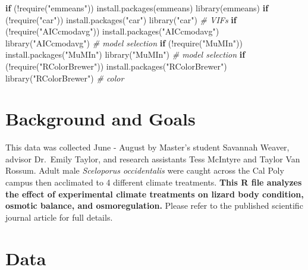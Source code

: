 \documentclass[
]{article}
\newenvironment{Shaded}{\begin{snugshade}}{\end{snugshade}}
\newcommand{\CommentTok}[1]{\textcolor[rgb]{0.56,0.35,0.01}{\textit{#1}}}
\newcommand{\ControlFlowTok}[1]{\textcolor[rgb]{0.13,0.29,0.53}{\textbf{#1}}}
\newcommand{\FunctionTok}[1]{\textcolor[rgb]{0.00,0.00,0.00}{#1}}
\newcommand{\NormalTok}[1]{#1}
\newcommand{\SpecialCharTok}[1]{\textcolor[rgb]{0.00,0.00,0.00}{#1}}
\newcommand{\StringTok}[1]{\textcolor[rgb]{0.31,0.60,0.02}{#1}}
\begin{document}
\begin{Shaded}
\begin{Highlighting}[]
\ControlFlowTok{if}\NormalTok{ (}\SpecialCharTok{!}\FunctionTok{require}\NormalTok{(}\StringTok{"emmeans"}\NormalTok{)) }\FunctionTok{install.packages}\NormalTok{(}\StringTok{\textquotesingle{}emmeans\textquotesingle{}}\NormalTok{)}
\FunctionTok{library}\NormalTok{(}\StringTok{\textquotesingle{}emmeans\textquotesingle{}}\NormalTok{)}
\ControlFlowTok{if}\NormalTok{ (}\SpecialCharTok{!}\FunctionTok{require}\NormalTok{(}\StringTok{"car"}\NormalTok{)) }\FunctionTok{install.packages}\NormalTok{(}\StringTok{"car"}\NormalTok{)}
\FunctionTok{library}\NormalTok{(}\StringTok{"car"}\NormalTok{) }\CommentTok{\# VIFs}
\ControlFlowTok{if}\NormalTok{ (}\SpecialCharTok{!}\FunctionTok{require}\NormalTok{(}\StringTok{"AICcmodavg"}\NormalTok{)) }\FunctionTok{install.packages}\NormalTok{(}\StringTok{"AICcmodavg"}\NormalTok{)}
\FunctionTok{library}\NormalTok{(}\StringTok{"AICcmodavg"}\NormalTok{) }\CommentTok{\# model selection}
\ControlFlowTok{if}\NormalTok{ (}\SpecialCharTok{!}\FunctionTok{require}\NormalTok{(}\StringTok{"MuMIn"}\NormalTok{)) }\FunctionTok{install.packages}\NormalTok{(}\StringTok{"MuMIn"}\NormalTok{)}
\FunctionTok{library}\NormalTok{(}\StringTok{"MuMIn"}\NormalTok{) }\CommentTok{\# model selection}
\ControlFlowTok{if}\NormalTok{ (}\SpecialCharTok{!}\FunctionTok{require}\NormalTok{(}\StringTok{"RColorBrewer"}\NormalTok{)) }\FunctionTok{install.packages}\NormalTok{(}\StringTok{"RColorBrewer"}\NormalTok{)}
\FunctionTok{library}\NormalTok{(}\StringTok{"RColorBrewer"}\NormalTok{) }\CommentTok{\# color}
\end{Highlighting}
\end{Shaded}

\hypertarget{background-and-goals}{%
\section{Background and Goals}\label{background-and-goals}}

This data was collected June - August by Master's student Savannah
Weaver, advisor Dr.~Emily Taylor, and research assistants Tess McIntyre
and Taylor Van Rossum. Adult male \emph{Sceloporus occidentalis} were
caught across the Cal Poly campus then acclimated to 4 different climate
treatments. \textbf{This R file analyzes the effect of experimental
climate treatments on lizard body condition, osmotic balance, and
osmoregulation.} Please refer to the published scientific journal
article for full details.

\hypertarget{data}{%
\section{Data}\label{data}}
\end{document}

